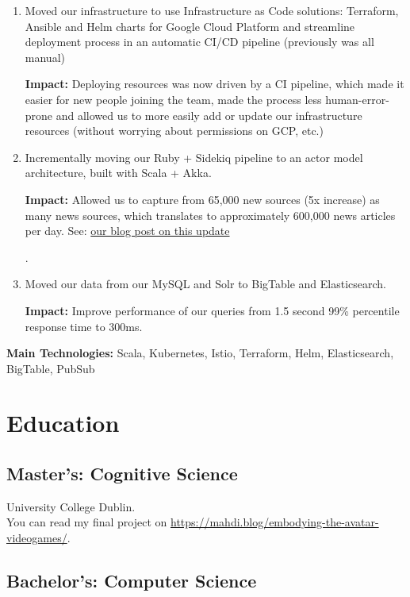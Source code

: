\documentclass[10pt,a4paper]{article}
\begin{document}
\begin{enumerate}
\item{Moved our infrastructure to use Infrastructure as Code solutions: Terraform, Ansible and Helm charts for Google Cloud Platform and streamline deployment process in an automatic CI/CD pipeline (previously was all manual)}

\textbf{Impact:} Deploying resources was now driven by a CI pipeline, which made it easier for new people joining the team, made the process less human-error-prone and allowed us to more easily add or update our infrastructure resources (without worrying about permissions on GCP, etc.)

\item{Incrementally moving our Ruby + Sidekiq pipeline to an actor model architecture, built with Scala + Akka.

\textbf{Impact:} Allowed us to capture from 65,000 new sources (5x increase) as many news sources, which translates to approximately 600,000 news articles per day. See: \href{https://aylien.com/blog/aylien-news-api-update-more-content-more-insights}{our blog post on this update}}.

\item{Moved our data from our MySQL and Solr to BigTable and Elasticsearch.

\textbf{Impact: } Improve performance of our queries from 1.5 second 99\% percentile response time to 300ms.}

\end{enumerate}

\textbf{Main Technologies: } Scala, Kubernetes, Istio, Terraform, Helm, Elasticsearch, BigTable, PubSub

\section{Education}

\subsection{Master's: Cognitive Science}

University College Dublin. \\
You can read my final project on \url{https://mahdi.blog/embodying-the-avatar-videogames/}.

\subsection{Bachelor's: Computer Science}
\end{document}
